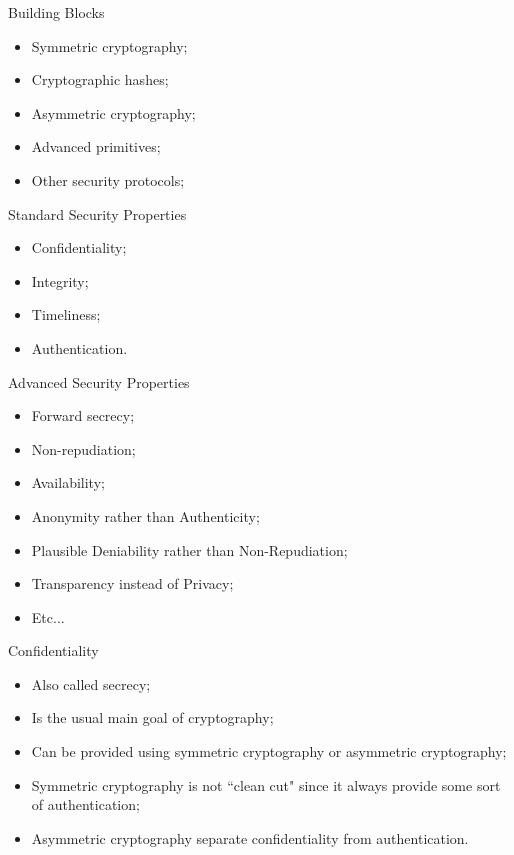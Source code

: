 \documentclass[12pt,table,xcolor={dvipsnames}]{beamer}
\begin{document}
\begin{frame}{Building Blocks}
\begin{itemize}
\item Symmetric cryptography;\pause
\item Cryptographic hashes;\pause
\item Asymmetric cryptography;\pause
\item Advanced primitives;\pause
\item Other security protocols;
\end{itemize}
\end{frame}

\begin{frame}{Standard Security Properties}
\begin{itemize}
\item Confidentiality;\pause
\item Integrity;\pause
\item Timeliness;\pause
\item Authentication.
\end{itemize}
\end{frame}

\begin{frame}{Advanced Security Properties}
\begin{itemize}
\item Forward secrecy;\pause
\item Non-repudiation;\pause
\item Availability;\pause
\item Anonymity rather than Authenticity;\pause
\item Plausible Deniability rather than Non-Repudiation;\pause
\item Transparency instead of Privacy; \pause
\item Etc...
\end{itemize}
\end{frame}

\begin{frame}{Confidentiality}
\begin{itemize}
\item Also called secrecy;\pause
\item Is the usual main goal of cryptography;\pause
\item Can be provided using symmetric cryptography or asymmetric cryptography;\pause
\item Symmetric cryptography is not ``clean cut" since it always provide some sort of authentication; \pause
\item Asymmetric cryptography separate confidentiality from authentication.
\end{itemize}
\end{frame}
\end{document}
